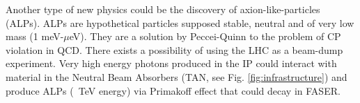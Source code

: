 Another type of new physics could be the discovery of axion-like-particles (ALPs). ALPs are hypothetical particles supposed stable, neutral and of very low mass (1 meV-$\mu$eV). They are a solution by Peccei-Quinn to the problem of CP violation in QCD.
There exists a possibility of using the LHC as a beam-dump experiment. Very high energy photons produced in the IP could interact with material in the Neutral Beam Absorbers (TAN, see Fig. \ref{fig:infrastructure}) and produce ALPs (~TeV energy) via Primakoff effect that could decay in FASER.



